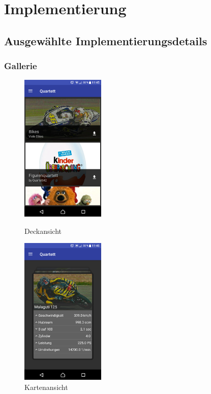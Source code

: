 \documentclass{scrartcl}
\begin{document}
\section{Implementierung}
\subsection{Ausgewählte Implementierungsdetails}
\subsubsection{Gallerie}

\begin{figure}
  \centering
  \begin{minipage}{0.45\textwidth}
    \centering
    \includegraphics[width=4cm]{img/gallery_decks.png}
    \caption{Deckansicht}
  \end{minipage}
  \hfill
  \begin{minipage}{0.45\textwidth}
    \centering
    \includegraphics[width=4cm]{img/gallery_cards.png}
    \caption{Kartenansicht}
  \end{minipage}
\end{figure}
\end{document}
